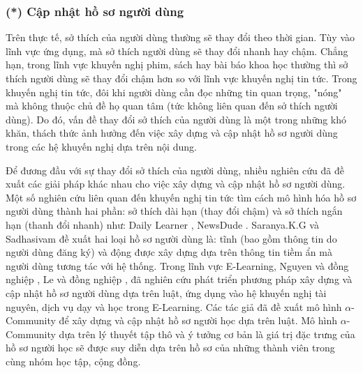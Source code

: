 \subsubsection*{(*) Cập nhật hồ sơ người dùng}  
Trên thực tế, sở thích của người dùng thường sẽ thay đổi theo thời gian. Tùy vào lĩnh vực ứng dụng, mà sở thích người dùng sẽ thay đổi nhanh hay chậm. Chẳng hạn, trong lĩnh vực khuyến nghị phim, sách hay bài báo khoa học thường thì sở thích người dùng sẽ thay đổi chậm hơn so với lĩnh vực khuyến nghị tin tức. Trong khuyến nghị tin tức, đôi khi người dùng cần đọc những tin quan trọng, "nóng" mà không thuộc chủ đề họ quan tâm (tức không liên quan đến sở thích người dùng). Do đó, vấn đề thay đổi sở thích của người dùng là một trong những khó khăn, thách thức ảnh hưởng đến việc xây dựng và cập nhật hồ sơ người dùng trong các hệ khuyến nghị dựa trên nội dung. 

Để đương đầu với sự thay đổi sở thích của người dùng, nhiều nghiên cứu đã đề xuất các giải pháp khác nhau cho việc xây dựng và cập nhật hồ sơ người dùng. Một số nghiên cứu liên quan đến khuyến nghị tin tức tìm cách mô hình hóa hồ sơ người dùng thành hai phần: sở thích dài hạn (thay đổi chậm) và sở thích ngắn hạn (thanh đổi nhanh) như: Daily Learner \cite{Billsus:2000:UMA:598285.598352}, NewsDude \cite{Billsus:1999:HUM:317328.317338}. Saranya.K.G và Sadhasivam đề xuất hai loại hồ sơ người dùng là: tĩnh (bao gồm thông tin do người dùng đăng ký) và động được xây dựng dựa trên thông tin tiềm ẩn mà người dùng tương tác với hệ thống. Trong lĩnh vực E-Learning, Nguyen và đồng nghiệp \cite{nguyentool}, Le và đồng nghiệp \cite{Le-ELearningSys}, đã nghiên cứu phát triển phương pháp xây dựng và cập nhật hồ sơ người dùng dựa trên luật, ứng dụng vào hệ khuyến nghị tài nguyên, dịch vụ dạy và học trong E-Learning. Các tác giả đã đề xuất mô hình $\alpha$-Community để xây dựng và cập nhật hồ sơ người học dựa trên luật. Mô hình $\alpha$-Community dựa trên lý thuyết tập thô và ý tưởng cơ bản là giá trị đặc trưng của hồ sơ người học sẽ được suy diễn dựa trên hồ sơ của những thành viên trong cùng nhóm học tập, cộng đồng. 

